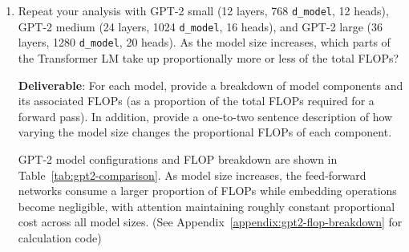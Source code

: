 \begin{enumerate}[label=(\alph*)]
    \item Repeat your analysis with GPT-2 small (12 layers, 768 \lstinline{d_model}, 12 heads), GPT-2 medium (24 layers, 1024 \lstinline{d_model}, 16 heads), and GPT-2 large (36 layers, 1280 \lstinline{d_model}, 20 heads). As the model size increases, which parts of the Transformer LM take up proportionally more or less of the total FLOPs?
    
    \textbf{Deliverable}: For each model, provide a breakdown of model components and its associated FLOPs (as a proportion of the total FLOPs required for a forward pass). In addition, provide a one-to-two sentence description of how varying the model size changes the proportional FLOPs of each component.
    
    \begin{answer}
    GPT-2 model configurations and FLOP breakdown are shown in Table~\ref{tab:gpt2-comparison}. 
    As model size increases, the feed-forward networks consume a larger proportion of FLOPs while embedding operations become negligible, with attention maintaining roughly constant proportional cost across all model sizes. (See Appendix~\ref{appendix:gpt2-flop-breakdown} for calculation code)
    \end{answer}
    

\end{enumerate}

